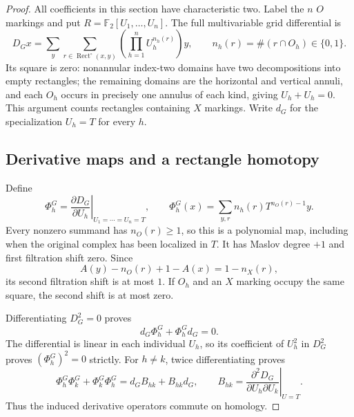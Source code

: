 \documentclass[11pt,a4paper]{article}
\theoremstyle{remark}
\begin{document}
\begin{proof}

All coefficients in this section have characteristic two.  Label the $n$
$O$ markings and put $R=\mathbb F_2[U_1,\ldots,U_n]$.  The full
multivariable grid differential is
\[
 D_Gx=\sum_y\sum_{r\in\operatorname{Rect}^{\circ}(x,y)}
       \left(\prod_{h=1}^n U_h^{n_h(r)}\right)y,
 \qquad n_h(r)=\#(r\cap O_h)\in\{0,1\}.
\]
Its square is zero: nonannular index-two domains have two decompositions
into empty rectangles; the remaining domains are the horizontal and vertical
annuli, and each $O_h$ occurs in precisely one annulus of each kind, giving
$U_h+U_h=0$.  This argument counts rectangles containing $X$ markings.
Write $d_G$ for the specialization $U_h=T$ for every $h$.

\subsection{Derivative maps and a rectangle homotopy}

Define
\[
 \Phi_h^G=\left.\frac{\partial D_G}{\partial U_h}\right|_{U_1=\cdots=U_n=T},
 \qquad
 \Phi_h^G(x)=\sum_{y,r} n_h(r)T^{n_O(r)-1}y.
\]
Every nonzero summand has $n_O(r)\ge1$, so this is a polynomial map,
including when the original complex has been localized in $T$.  It has
Maslov degree $+1$ and first filtration shift zero.  Since
\[
 A(y)-n_O(r)+1-A(x)=1-n_X(r),
\]
its second filtration shift is at most $1$.  If $O_h$ and an $X$ marking
occupy the same square, the second shift is at most zero.

Differentiating $D_G^2=0$ proves
\[
 d_G\Phi_h^G+\Phi_h^Gd_G=0.
\]
The differential is linear in each individual $U_h$, so its coefficient
of $U_h^2$ in $D_G^2$ proves $(\Phi_h^G)^2=0$ strictly.  For $h\ne k$,
twice differentiating proves
\[
 \Phi_h^G\Phi_k^G+\Phi_k^G\Phi_h^G
 =d_G B_{hk}+B_{hk}d_G,
 \qquad
 B_{hk}=\left.\frac{\partial^2D_G}{\partial U_h\partial U_k}
         \right|_{U=T}.
\]
Thus the induced derivative operators commute on homology.


\end{proof}
\end{document}
